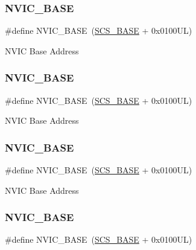 \subsubsection{\texorpdfstring{NVIC\_BASE}{NVIC\_BASE}\hspace{0.1cm}{\footnotesize\ttfamily [2/12]}}
{\footnotesize\ttfamily \#define N\+V\+I\+C\+\_\+\+B\+A\+SE~(\mbox{\hyperlink{group___c_m_s_i_s__core__base_ga3c14ed93192c8d9143322bbf77ebf770}{S\+C\+S\+\_\+\+B\+A\+SE}} +  0x0100\+U\+L)}

N\+V\+IC Base Address \mbox{\label{group___c_m_s_i_s__core__base_gaa0288691785a5f868238e0468b39523d}} 
\subsubsection{\texorpdfstring{NVIC\_BASE}{NVIC\_BASE}\hspace{0.1cm}{\footnotesize\ttfamily [3/12]}}
{\footnotesize\ttfamily \#define N\+V\+I\+C\+\_\+\+B\+A\+SE~(\mbox{\hyperlink{group___c_m_s_i_s__core__base_ga3c14ed93192c8d9143322bbf77ebf770}{S\+C\+S\+\_\+\+B\+A\+SE}} +  0x0100\+U\+L)}

N\+V\+IC Base Address \mbox{\label{group___c_m_s_i_s__core__base_gaa0288691785a5f868238e0468b39523d}} 
\subsubsection{\texorpdfstring{NVIC\_BASE}{NVIC\_BASE}\hspace{0.1cm}{\footnotesize\ttfamily [4/12]}}
{\footnotesize\ttfamily \#define N\+V\+I\+C\+\_\+\+B\+A\+SE~(\mbox{\hyperlink{group___c_m_s_i_s__core__base_ga3c14ed93192c8d9143322bbf77ebf770}{S\+C\+S\+\_\+\+B\+A\+SE}} +  0x0100\+U\+L)}

N\+V\+IC Base Address \mbox{\label{group___c_m_s_i_s__core__base_gaa0288691785a5f868238e0468b39523d}} 
\subsubsection{\texorpdfstring{NVIC\_BASE}{NVIC\_BASE}\hspace{0.1cm}{\footnotesize\ttfamily [5/12]}}
{\footnotesize\ttfamily \#define N\+V\+I\+C\+\_\+\+B\+A\+SE~(\mbox{\hyperlink{group___c_m_s_i_s__core__base_ga3c14ed93192c8d9143322bbf77ebf770}{S\+C\+S\+\_\+\+B\+A\+SE}} +  0x0100\+U\+L)}

